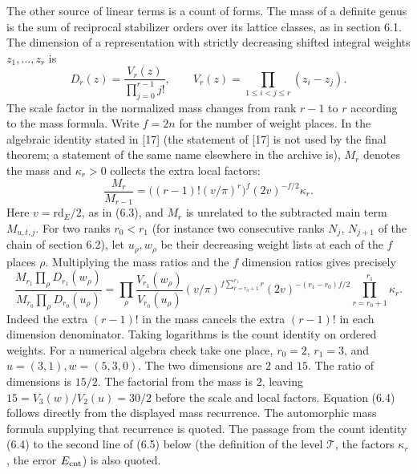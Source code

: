 \documentclass[11pt,letterpaper]{article}
\begin{document}
{The other source of linear terms is a count of forms. The mass of a definite genus is the sum of reciprocal stabilizer orders over its lattice classes, as in section 6.1. The dimension of a representation with strictly decreasing shifted integral weights $z_1,\ldots,z_r$ is
\begin{equation}\label{D:94}
 D_r(z)=\frac{V_r(z)}{\prod_{j=0}^{r-1}j!},\qquad
 V_r(z)=\prod_{1\le i<j\le r}(z_i-z_j).
\end{equation}
The scale factor in the normalized mass changes from rank $r-1$ to $r$ according to the mass formula. Write $f=2n$ for the number of weight places. In the algebraic identity stated in [17] (the statement of [17] is not used by the final theorem; a statement of the same name elsewhere in the archive is), $M_r$ denotes the mass and $\kappa_r>0$ collects the extra local factors:
\begin{equation}\label{D:95}
 \frac{M_r}{M_{r-1}}=
 \big((r-1)!(v/\pi)^r\big)^f(2v)^{-f/2}\kappa_r .
\end{equation}
Here $v=\mathrm{rd}_E/2$, as in (6.3), and $M_r$ is unrelated to the subtracted main term $M_{u,t,j}$. For two ranks $r_0<r_1$ (for instance two consecutive ranks $N_j$, $N_{j+1}$ of the chain of section 6.2), let $u_\rho,w_\rho$ be their decreasing weight lists at each of the $f$ places $\rho$. Multiplying the mass ratios and the $f$ dimension ratios gives precisely
\begin{equation}\label{D:96}
 \frac{M_{r_1}\prod_\rho D_{r_1}(w_\rho)}{M_{r_0}\prod_\rho D_{r_0}(u_\rho)}
 =\prod_\rho\frac{V_{r_1}(w_\rho)}{V_{r_0}(u_\rho)}
   (v/\pi)^{f\sum_{r=r_0+1}^{r_1} r}(2v)^{-(r_1-r_0)f/2}
   \prod_{r=r_0+1}^{r_1}\kappa_r .                                   \tag{6.4}
\end{equation}
Indeed the extra $(r-1)!$ in the mass cancels the extra $(r-1)!$ in each dimension denominator. Taking logarithms is the count identity on ordered weights. For a numerical algebra check take one place, $r_0=2$, $r_1=3$, and $u=(3,1),w=(5,3,0)$. The two dimensions are $2$ and $15$. The ratio of dimensions is $15/2$. The factorial from the mass is $2$, leaving $15=V_3(w)/V_2(u)=30/2$ before the scale and local factors. Equation (6.4) follows directly from the displayed mass recurrence. The automorphic mass formula supplying that recurrence is quoted. The passage from the count identity (6.4) to the second line of (6.5) below (the definition of the level $\mathcal T$, the factors $\kappa_r$, the error $E_{\rm cnt}$) is also quoted.

}
\end{document}
